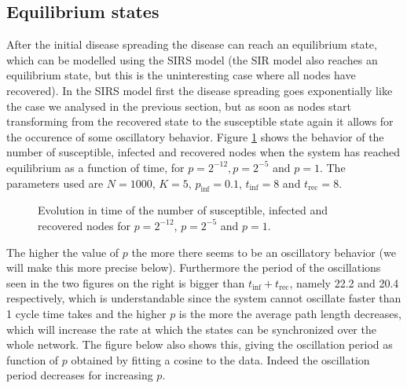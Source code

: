 \documentclass[10pt,a4paper]{article}
\begin{document}
\subsection{Equilibrium states}
\noindent After the initial disease spreading the disease can reach an equilibrium state, which can be modelled using the SIRS model (the SIR model also reaches an equilibrium state, but this is the uninteresting case where all nodes have recovered). In the SIRS model first the disease spreading goes exponentially like the case we analysed in the previous section, but as soon as nodes start transforming from the recovered state to the susceptible state again it allows for the occurence of some oscillatory behavior. Figure \ref{fig:p} shows the behavior of the number of susceptible, infected and recovered nodes when the system has reached equilibrium as a function of time, for $p = 2^{-12}, p = 2^{-5}$ and $p = 1$. The parameters used are $N = 1000$, $K = 5$, $p_{\text{inf}} = 0.1$, $t_{\text{inf}} = 8$ and $t_{\text{rec}} = 8$.
 
\begin{figure}[H]
 \centering  
 \caption{Evolution in time of the number of susceptible, infected and recovered nodes for $p = 2^{-12}$, $p = 2^{-5}$ and $p = 1$.}
 \label{fig:p}
\end{figure}

\noindent The higher the value of $p$ the more there seems to be an oscillatory behavior (we will make this more precise below). Furthermore the period of the oscillations seen in the two figures on the right is bigger than $t_{\text{inf}} + t_{\text{rec}}$, namely 22.2 and 20.4 respectively, which is understandable since the system cannot oscillate faster than 1 cycle time takes and the higher $p$ is the more the average path length decreases, which will increase the rate at which the states can be synchronized over the whole network. The figure below also shows this, giving the oscillation period as function of $p$ obtained by fitting a cosine to the data. Indeed the oscillation period decreases for increasing $p$. 
\end{document}
